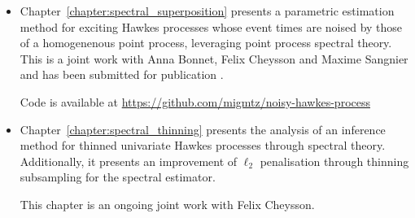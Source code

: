     \begin{itemize}
      \item Chapter~\ref{chapter:spectral_superposition} presents a parametric estimation method for exciting Hawkes processes whose event times are noised by those of a homogenenous point process, leveraging point process spectral theory. 
      This is a joint work with Anna Bonnet, Felix Cheysson and Maxime Sangnier and has been submitted for publication \parencite{Bonnet2024}.

      Code is available at \url{https://github.com/migmtz/noisy-hawkes-process}

      \item Chapter~\ref{chapter:spectral_thinning} presents the analysis of an inference method for thinned univariate Hawkes processes through spectral theory. 
      Additionally, it presents an improvement of $\ell_2$ penalisation through thinning subsampling for the spectral estimator.

      This chapter is an ongoing joint work with Felix Cheysson.
    \end{itemize}





